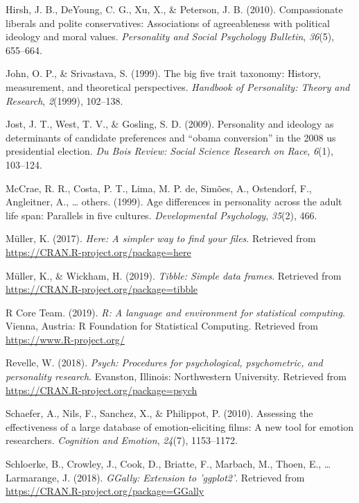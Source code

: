 \documentclass[man]{apa6}
\begin{document}
\hypertarget{ref-hirsh2010compassionate}{}
Hirsh, J. B., DeYoung, C. G., Xu, X., \& Peterson, J. B. (2010).
Compassionate liberals and polite conservatives: Associations of
agreeableness with political ideology and moral values.
\emph{Personality and Social Psychology Bulletin}, \emph{36}(5),
655--664.

\hypertarget{ref-john1999big}{}
John, O. P., \& Srivastava, S. (1999). The big five trait taxonomy:
History, measurement, and theoretical perspectives. \emph{Handbook of
Personality: Theory and Research}, \emph{2}(1999), 102--138.

\hypertarget{ref-jost2009personality}{}
Jost, J. T., West, T. V., \& Gosling, S. D. (2009). Personality and
ideology as determinants of candidate preferences and ``obama
conversion'' in the 2008 us presidential election. \emph{Du Bois Review:
Social Science Research on Race}, \emph{6}(1), 103--124.

\hypertarget{ref-mccrae1999age}{}
McCrae, R. R., Costa, P. T., Lima, M. P. de, Simões, A., Ostendorf, F.,
Angleitner, A., \ldots{} others. (1999). Age differences in personality
across the adult life span: Parallels in five cultures.
\emph{Developmental Psychology}, \emph{35}(2), 466.

\hypertarget{ref-R-here}{}
Müller, K. (2017). \emph{Here: A simpler way to find your files}.
Retrieved from \url{https://CRAN.R-project.org/package=here}

\hypertarget{ref-R-tibble}{}
Müller, K., \& Wickham, H. (2019). \emph{Tibble: Simple data frames}.
Retrieved from \url{https://CRAN.R-project.org/package=tibble}

\hypertarget{ref-R-base}{}
R Core Team. (2019). \emph{R: A language and environment for statistical
computing}. Vienna, Austria: R Foundation for Statistical Computing.
Retrieved from \url{https://www.R-project.org/}

\hypertarget{ref-R-psych}{}
Revelle, W. (2018). \emph{Psych: Procedures for psychological,
psychometric, and personality research}. Evanston, Illinois:
Northwestern University. Retrieved from
\url{https://CRAN.R-project.org/package=psych}

\hypertarget{ref-schaefer2010}{}
Schaefer, A., Nils, F., Sanchez, X., \& Philippot, P. (2010). Assessing
the effectiveness of a large database of emotion-eliciting films: A new
tool for emotion researchers. \emph{Cognition and Emotion},
\emph{24}(7), 1153--1172.

\hypertarget{ref-R-GGally}{}
Schloerke, B., Crowley, J., Cook, D., Briatte, F., Marbach, M., Thoen,
E., \ldots{} Larmarange, J. (2018). \emph{GGally: Extension to
'ggplot2'}. Retrieved from
\url{https://CRAN.R-project.org/package=GGally}
\end{document}
